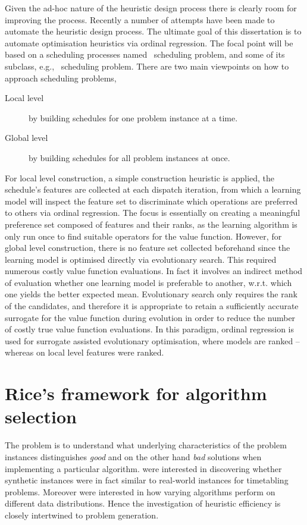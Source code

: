 Given the ad-hoc nature of the heuristic design process there is clearly room for improving the process. Recently a number of attempts have been made to automate the heuristic design process. 
The ultimate goal of this dissertation is to automate optimisation heuristics via ordinal regression. 
The focal point will be based on a scheduling processes named \jsp\ scheduling problem, and some of its subclass, e.g., \fsp\ scheduling problem.
There are two main viewpoints on how to approach scheduling problems,
\begin{description}
	\item[Local level] by building schedules for one problem instance at a time.
	\item[Global level] by building schedules for all problem instances at once.
\end{description}
For local level construction, a simple construction heuristic is applied, the schedule's features are collected at each dispatch iteration, from which a learning model will inspect the feature set to discriminate which operations are preferred to others via ordinal regression. The focus is essentially on creating a meaningful preference set composed of features and their ranks, as the learning algorithm is only run once to find suitable operators for the value function. 
However, for global level construction, there is no feature set collected beforehand since the learning model is optimised directly via evolutionary search. This required numerous costly value function evaluations. In fact it involves an indirect method of evaluation whether one learning model is preferable to another, w.r.t. which one yields the better expected mean. 
Evolutionary search only requires the rank of the candidates, and therefore it is appropriate to retain a sufficiently accurate surrogate for the value function during evolution in order to reduce the number of costly true value function evaluations. In this paradigm, ordinal regression is used for surrogate assisted evolutionary optimisation, where models are ranked -- whereas on local level features were ranked. 

\section{Rice's framework for algorithm selection}\label{sec:rice}
The problem is to understand what underlying characteristics of the problem instances distinguishes \emph{good} and on the other hand \emph{bad} solutions when implementing a particular algorithm. \citet{SmithMilesLion5} were interested in discovering whether synthetic instances were in fact similar to real-world instances for timetabling problems. Moreover \citeauthor{SmithMilesLion5} were interested in how varying algorithms perform on different data distributions. Hence the investigation of heuristic efficiency is closely intertwined to problem generation. 

